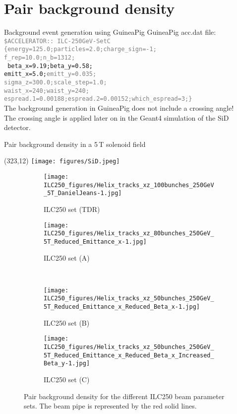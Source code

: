 \documentclass[xcolor={dvipsnames}]{beamer}
\newcommand{\sidlogo}{
  \setlength{\TPHorizModule}{1pt}
  \setlength{\TPVertModule}{1pt}
  \begin{textblock}{1}(323,12)
   \texttt{[image: figures/SiD.jpeg]}
  \end{textblock}
  }
\begin{document}
\section{Pair background density}
\begin{frame}{Background event generation using GuineaPig}
GuineaPig acc.dat file:\\
{\small\texttt{\textcolor{Gray}{\$ACCELERATOR:: ILC-250GeV-SetC \\                                                                            
\{energy=125.0;particles=2.0;charge\_sign=-1;\\
f\_rep=10.0;n\_b=1312;\\}
beta\_x=9.19;beta\_y=0.58;\\
emitt\_x=5.0;\textcolor{Gray}{emitt\_y=0.035;\\
sigma\_z=300.0;scale\_step=1.0;\\
waist\_x=240;waist\_y=240;\\
espread.1=0.00188;espread.2=0.00152;which\_espread=3;\}}
}}\\
\vspace*{0.3cm}
 The background generation in GuineaPig \alert{does not include a crossing angle}!\\
 The crossing angle is applied later on in the Geant4 simulation of the SiD detector.
\end{frame}

\begin{frame}{Pair background density in a 5\,T solenoid field}
\sidlogo
 \begin{figure}
\centering
\begin{subfigure}[t]{0.35\textwidth}
\centering
\texttt{[image: ILC250\_figures/Helix\_tracks\_xz\_100bunches\_250GeV\_5T\_DanielJeans-1.jpg]}
\caption{ILC250 set (TDR)}
\end{subfigure}
\hspace*{0.1cm}
\begin{subfigure}[t]{0.35\textwidth}
\centering
\texttt{[image: ILC250\_figures/Helix\_tracks\_xz\_80bunches\_250GeV\_5T\_Reduced\_Emittance\_x-1.jpg]}
\caption{ILC250 set (A)}
\end{subfigure}
\\
\begin{subfigure}[t]{0.35\textwidth}
\centering
\texttt{[image: ILC250\_figures/Helix\_tracks\_xz\_50bunches\_250GeV\_5T\_Reduced\_Emittance\_x\_Reduced\_Beta\_x-1.jpg]}
\caption{ILC250 set (B)}
\end{subfigure}
\hspace*{0.1cm}
\begin{subfigure}[t]{0.35\textwidth}
\centering
\texttt{[image: ILC250\_figures/Helix\_tracks\_xz\_50bunches\_250GeV\_5T\_Reduced\_Emittance\_x\_Reduced\_Beta\_x\_Increased\_Beta\_y-1.jpg]}
\caption{ILC250 set (C)}
\end{subfigure}
\caption{Pair background density for the different ILC250 beam parameter sets.
The beam pipe is represented by the red solid lines.}
\label{fig:Envelopes}
\end{figure}

\end{frame}
\end{document}
